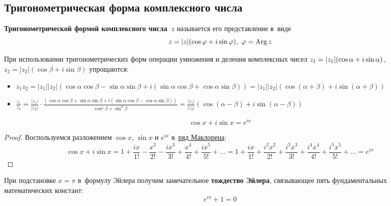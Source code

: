 \subsection{Тригонометрическая форма комплексного числа}
\textbf{Тригонометрической формой комплексного числа~$z$} называется его представление в~виде
\begin{equation*}
z = |z|(\cos \varphi + i\sin \varphi), \ \varphi = \operatorname{Arg} z
\end{equation*}

При использовании тригонометрических форм операции умножения и деления комплексных чисел
$z_1 = |z_1| \* (\cos \alpha + i\sin \alpha)$, $z_2 = |z_2|(\cos \beta + i\sin \beta)$ упрощаются:
\begin{itemize}
	\item $\displaystyle z_1 z_2 = |z_1| |z_2|(\cos \alpha \cos \beta - \sin \alpha \sin \beta + i(\sin \alpha \cos \beta + \cos \alpha \sin \beta)) =
	|z_1| |z_2|(\cos (\alpha + \beta) + i\sin (\alpha + \beta))$
	
	\item $\displaystyle \frac{z_1}{z_2} = \frac{|z_1|}{|z_2|} \cdot
	\frac{(\cos \alpha \cos \beta + \sin \alpha \sin \beta + i(\sin \alpha \cos \beta - \cos \alpha \sin \beta))}
	{\cos^2 \beta + \sin^2 \beta} =
	\frac{|z_1|}{|z_2|} (\cos (\alpha - \beta) + i\sin (\alpha - \beta))$
\end{itemize}

\begin{theorem}
\begin{equation*}
\cos x + i\sin x = e^{ix}
\end{equation*}
\end{theorem}
\begin{proof}
Воспользуемся разложением $\cos x$, $\sin x$ и $e^{ix}$ в~\hyperref[eq:Maclaurin_series]{ряд Маклорена}:
\begin{equation*}
\cos x + i\sin x = 1 + \frac{ix}{1!} - \frac{x^2}{2!} - \frac{ix^3}{3!} + \frac{x^4}{4!} + \frac{ix^5}{5!} + \ldots =
1 + \frac{ix}{1!} + \frac{i^2 x^2}{2!} + \frac{i^3 x^3}{3!} + \frac{i^4 x^4}{4!} + \frac{i^5 x^5}{5!} + \ldots = e^{ix}
\end{equation*}
\end{proof}

При подстановке $x = \pi$ в~формулу Эйлера получим замечательное \textbf{тождество Эйлера}, связывающее пять фундаментальных математических констант:
\begin{equation*}
e^{i\pi} + 1 = 0
\end{equation*}

